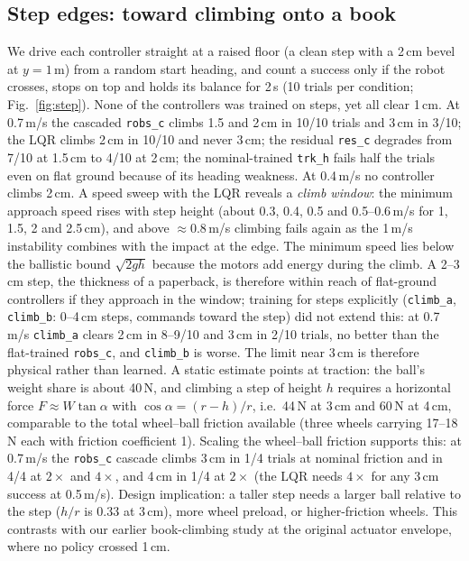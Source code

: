\documentclass[conference]{IEEEtran}
\theoremstyle{remark}
\begin{document}
\subsection{Step edges: toward climbing onto a book}
We drive each controller straight at a raised floor (a clean step with a 2\,cm bevel at $y=1$\,m) from a random start heading, and count a success only if the robot crosses, stops on top and holds its balance for 2\,s (10 trials per condition; Fig.~\ref{fig:step}). None of the controllers was trained on steps, yet all clear 1\,cm. At 0.7\,m/s the cascaded \texttt{robs\_c} climbs 1.5 and 2\,cm in 10/10 trials and 3\,cm in 3/10; the LQR climbs 2\,cm in 10/10 and never 3\,cm; the residual \texttt{res\_c} degrades from 7/10 at 1.5\,cm to 4/10 at 2\,cm; the nominal-trained \texttt{trk\_h} fails half the trials even on flat ground because of its heading weakness. At 0.4\,m/s no controller climbs 2\,cm. A speed sweep with the LQR reveals a \emph{climb window}: the minimum approach speed rises with step height (about 0.3, 0.4, 0.5 and 0.5--0.6\,m/s for 1, 1.5, 2 and 2.5\,cm), and above $\approx$0.8\,m/s climbing fails again as the 1\,m/s instability combines with the impact at the edge. The minimum speed lies below the ballistic bound $\sqrt{2gh}$ because the motors add energy during the climb. A 2--3\,cm step, the thickness of a paperback, is therefore within reach of flat-ground controllers if they approach in the window; training for steps explicitly (\texttt{climb\_a}, \texttt{climb\_b}: 0--4\,cm steps, commands toward the step) did not extend this: at 0.7\,m/s \texttt{climb\_a} clears 2\,cm in 8--9/10 and 3\,cm in 2/10 trials, no better than the flat-trained \texttt{robs\_c}, and \texttt{climb\_b} is worse. The limit near 3\,cm is therefore physical rather than learned. A static estimate points at traction: the ball's weight share is about 40\,N, and climbing a step of height $h$ requires a horizontal force $F\approx W\tan\alpha$ with $\cos\alpha=(r-h)/r$, i.e.\ 44\,N at 3\,cm and 60\,N at 4\,cm, comparable to the total wheel--ball friction available (three wheels carrying 17--18\,N each with friction coefficient 1). Scaling the wheel--ball friction supports this: at 0.7\,m/s the \texttt{robs\_c} cascade climbs 3\,cm in 1/4 trials at nominal friction and in 4/4 at $2\times$ and $4\times$, and 4\,cm in 1/4 at $2\times$ (the LQR needs $4\times$ for any 3\,cm success at 0.5\,m/s). Design implication: a taller step needs a larger ball relative to the step ($h/r$ is 0.33 at 3\,cm), more wheel preload, or higher-friction wheels. This contrasts with our earlier book-climbing study at the original actuator envelope, where no policy crossed 1\,cm.
\end{document}
